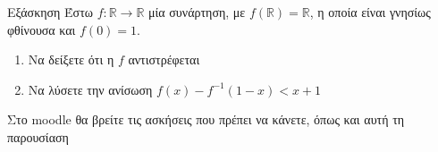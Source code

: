 \documentclass{presentation}
\begin{document}
\begin{frame}{Εξάσκηση}
  Έστω $f:\mathbb{R}\to\mathbb{R}$ μία συνάρτηση, με $f(\mathbb{R})=\mathbb{R}$, η οποία είναι γνησίως φθίνουσα και $f(0)=1$.
  \begin{enumerate}
    \item Να δείξετε ότι η $f$ αντιστρέφεται \pause
    \item Να λύσετε την ανίσωση $f(x)-f^{-1}(1-x)<x+1$
  \end{enumerate}
\end{frame}

\begin{frame}
  Στο moodle θα βρείτε τις ασκήσεις που πρέπει να κάνετε, όπως και αυτή τη παρουσίαση
\end{frame}
\end{document}
